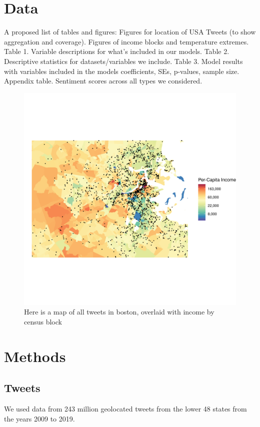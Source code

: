 \documentclass{article}
\begin{document}
\section{Data}
A proposed list of tables and figures:
Figures for location of USA Tweets (to show aggregation and coverage).
Figures of income blocks and temperature extremes.
Table 1. Variable descriptions for what's included in our models.
Table 2. Descriptive statistics for datasets/variables we include.
Table 3. Model results with variables included in the models coefficients, SEs, p-values, sample size.
Appendix table. Sentiment scores across all types we considered.
\begin{figure}[H]
  \centering
  \includegraphics[width=\linewidth]{../res/Boston_Map.png}
  \caption{Here is a map of all tweets in boston, overlaid with income by census block}
  \label{fig:timeseries}
\end{figure}

\section{Methods}
\subsection{Tweets}
We used data from 243 million geolocated tweets from the lower 48 states from the years 2009 to 2019.  
\end{document}
